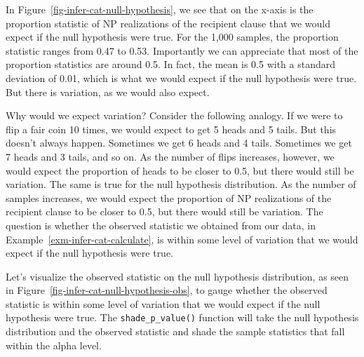 \documentclass[
  letterpaper,
  krantz1]{latex/krantz-mod}
\theoremstyle{definition}
\theoremstyle{definition}
\theoremstyle{remark}
\begin{document}
In Figure~\ref{fig-infer-cat-null-hypothesis}, we see that on the x-axis
is the proportion statistic of NP realizations of the recipient clause
that we would expect if the null hypothesis were true. For the 1,000
samples, the proportion statistic ranges from 0.47 to 0.53. Importantly
we can appreciate that most of the proportion statistics are around 0.5.
In fact, the mean is 0.5 with a standard
deviation of 0.01, which is
what we would expect if the null hypothesis were true. But there is
variation, as we would also expect.

Why would we expect variation? Consider the following analogy. If we
were to flip a fair coin 10 times, we would expect to get 5 heads and 5
tails. But this doesn't always happen. Sometimes we get 6 heads and 4
tails. Sometimes we get 7 heads and 3 tails, and so on. As the number of
flips increases, however, we would expect the proportion of heads to be
closer to 0.5, but there would still be variation. The same is true for
the null hypothesis distribution. As the number of samples increases, we
would expect the proportion of NP realizations of the recipient clause
to be closer to 0.5, but there would still be variation. The question is
whether the observed statistic we obtained from our data, in
Example~\ref{exm-infer-cat-calculate}, is within some level of variation
that we would expect if the null hypothesis were true.

Let's visualize the observed statistic on the null hypothesis
distribution, as seen in
Figure~\ref{fig-infer-cat-null-hypothesis-obs}, to gauge whether the
observed statistic is within some level of variation that we would
expect if the null hypothesis were true. The \texttt{shade\_p\_value()}
function will take the null hypothesis distribution and the observed
statistic and shade the sample statistics that fall within the alpha
level.
\end{document}

